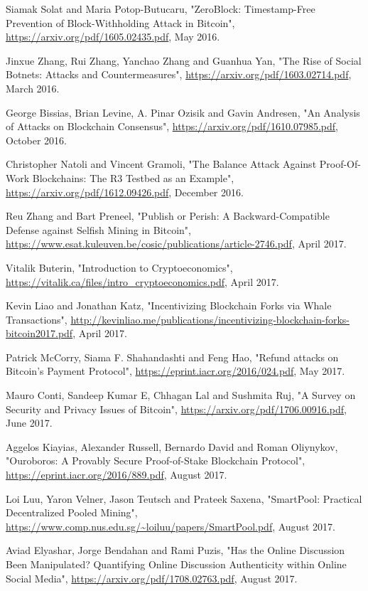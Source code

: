 \documentclass[12pt,a4paper]{article}
\begin{document}
\begin{thebibliography}{9}
Siamak Solat and Maria Potop-Butucaru,
"ZeroBlock: Timestamp-Free Prevention of Block-Withholding Attack in Bitcoin",
\url{https://arxiv.org/pdf/1605.02435.pdf},
May 2016.

Jinxue Zhang, Rui Zhang, Yanchao Zhang and Guanhua Yan,
"The Rise of Social Botnets: Attacks and Countermeasures",
\url{https://arxiv.org/pdf/1603.02714.pdf},
March 2016.

George Bissias, Brian Levine, A. Pinar Ozisik and Gavin Andresen,
"An Analysis of Attacks on Blockchain Consensus",
\url{https://arxiv.org/pdf/1610.07985.pdf},
October 2016.

Christopher Natoli and Vincent Gramoli,
"The Balance Attack Against Proof-Of-Work Blockchains: The R3 Testbed as an Example",
\url{https://arxiv.org/pdf/1612.09426.pdf},
December 2016.

Reu Zhang and Bart Preneel,
"Publish or Perish: A Backward-Compatible Defense against Selfish Mining in Bitcoin",
\url{https://www.esat.kuleuven.be/cosic/publications/article-2746.pdf},
April 2017.

Vitalik Buterin,
"Introduction to Cryptoeconomics",
\url{https://vitalik.ca/files/intro_cryptoeconomics.pdf},
April 2017.

Kevin Liao and Jonathan Katz,
"Incentivizing Blockchain Forks via Whale Transactions",
\url{http://kevinliao.me/publications/incentivizing-blockchain-forks-bitcoin2017.pdf},
April 2017.

Patrick McCorry, Siama F. Shahandashti and Feng Hao,
"Refund attacks on Bitcoin's Payment Protocol",
\url{https://eprint.iacr.org/2016/024.pdf},
May 2017.

Mauro Conti, Sandeep Kumar E, Chhagan Lal and Sushmita Ruj,
"A Survey on Security and Privacy Issues of Bitcoin",
\url{https://arxiv.org/pdf/1706.00916.pdf},
June 2017.

Aggelos Kiayias, Alexander Russell, Bernardo David and Roman Oliynykov,
"Ouroboros: A Provably Secure Proof-of-Stake Blockchain Protocol",
\url{https://eprint.iacr.org/2016/889.pdf},
August 2017.

Loi Luu, Yaron Velner, Jason Teutsch and Prateek Saxena,
"SmartPool: Practical Decentralized Pooled Mining",
\url{https://www.comp.nus.edu.sg/~loiluu/papers/SmartPool.pdf},
August 2017.

Aviad Elyashar, Jorge Bendahan and Rami Puzis,
"Has the Online Discussion Been Manipulated? Quantifying Online Discussion Authenticity within Online Social Media",
\url{https://arxiv.org/pdf/1708.02763.pdf},
August 2017.


\end{thebibliography}
\end{document}
